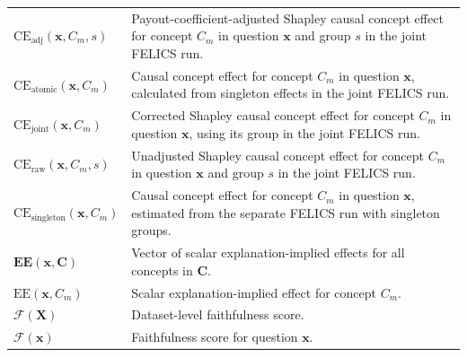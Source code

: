 \begin{longtable}{@{}>{\raggedright\arraybackslash}p{} p{}@{}}
	$\mathrm{CE}_{\mathrm{adj}}(\mathbf{x},C_m,s)$     & Payout-coefficient-adjusted Shapley causal concept effect for concept $C_m$ in question $\mathbf{x}$ and group $s$ in the joint FELICS run.                                                           \\
	$\mathrm{CE}_{\mathrm{atomic}}(\mathbf{x},C_m)$    & Causal concept effect for concept $C_m$ in question $\mathbf{x}$, calculated from singleton effects in the joint FELICS run.                                                                          \\
	$\mathrm{CE}_{\mathrm{joint}}(\mathbf{x},C_m)$     & Corrected Shapley causal concept effect for concept $C_m$ in question $\mathbf{x}$, using its group in the joint FELICS run.                                                                          \\
	$\mathrm{CE}_{\mathrm{raw}}(\mathbf{x},C_m,s)$     & Unadjusted Shapley causal concept effect for concept $C_m$ in question $\mathbf{x}$ and group $s$ in the joint FELICS run.                                                                            \\
	$\mathrm{CE}_{\mathrm{singleton}}(\mathbf{x},C_m)$ & Causal concept effect for concept $C_m$ in question $\mathbf{x}$, estimated from the separate FELICS run with singleton groups.                                                                       \\
	$\mathbf{EE}(\mathbf{x},\mathbf{C})$               & Vector of scalar explanation-implied effects for all concepts in $\mathbf{C}$.                                                                                                                        \\
	$\mathrm{EE}(\mathbf{x},C_m)$                      & Scalar explanation-implied effect for concept $C_m$.                                                                                                                                                  \\
	$\mathcal{F}(\mathbf{X})$                          & Dataset-level faithfulness score.                                                                                                                                                                     \\
	$\mathcal{F}(\mathbf{x})$                          & Faithfulness score for question $\mathbf{x}$.                                                                                                                                                         \\

\end{longtable}

